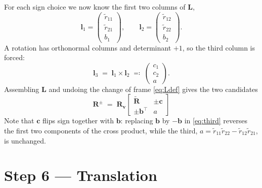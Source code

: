 \documentclass[11pt,a4paper]{article}
\theoremstyle{remark}
\newcommand{\Rmat}{\mathbf{R}}
\newcommand{\Rtil}{\widetilde{\mathbf{R}}}
\newcommand{\Lmat}{\mathbf{L}}
\newcommand{\Rvee}{\mathbf{R}_{\vvec}}
\newcommand{\bvec}{\mathbf{b}}
\newcommand{\cvec}{\mathbf{c}}
\newcommand{\lvec}{\mathbf{l}}
\newcommand{\vvec}{\mathbf{v}}
\begin{document}
For each sign choice we now know the first two columns of $\Lmat$,
\begin{equation}
  \lvec_1 =
  \begin{pmatrix} \tilde r_{11} \\ \tilde r_{21} \\ b_1 \end{pmatrix},
  \qquad
  \lvec_2 =
  \begin{pmatrix} \tilde r_{12} \\ \tilde r_{22} \\ b_2 \end{pmatrix}.
\end{equation}
A rotation has orthonormal columns and determinant $+1$, so the third column is
forced:
\begin{equation}
  \lvec_3 \;=\; \lvec_1 \times \lvec_2
  \;\eqqcolon\;
  \begin{pmatrix} c_1 \\ c_2 \\ a \end{pmatrix}.
  \label{eq:third}
\end{equation}
Assembling $\Lmat$ and undoing the change of frame \eqref{eq:Ldef} gives the two
candidates
\begin{equation}
  \boxed{\;
  \Rmat^{\pm} \;=\; \Rvee
  \begin{bmatrix}
    \Rtil & \pm\cvec \\[2pt]
    \pm\bvec^{\top} & a
  \end{bmatrix}
  \;}
  \label{eq:twoposes}
\end{equation}
Note that $\cvec$ flips sign together with $\bvec$: replacing $\bvec$ by
$-\bvec$ in \eqref{eq:third} reverses the first two components of the cross
product, while the third,
$a = \tilde r_{11}\tilde r_{22} - \tilde r_{12}\tilde r_{21}$, is unchanged.

\section{Step 6 --- Translation}
\end{document}
